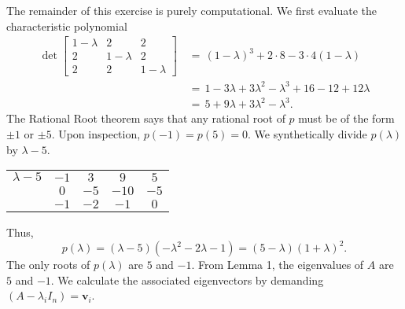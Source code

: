 \documentclass[10pt]{article}
\def\v{\bm{v}}
\def\det{\operatorname{det}}
\begin{document}
        The remainder of this exercise is purely computational. We first evaluate the characteristic polynomial
        \begin{align*}
                \det \begin{bmatrix}
                        1 - \lambda & 2 & 2 \\ 2 & 1 - \lambda & 2 \\ 2 & 2 & 1 - \lambda
                \end{bmatrix}
                        \,&=\, (1 - \lambda)^3  + 2\cdot 8 - 3\cdot 4(1 - \lambda) \\
                        \,&=\, 1 - 3\lambda + 3\lambda^2 - \lambda^3 + 16 - 12 + 12\lambda \\
                        \,&=\, 5 + 9\lambda + 3\lambda^2 - \lambda^3.
        \end{align*}
        The Rational Root theorem says that any rational root of $p$ must be of the form $\pm 1$ or $\pm 5$. Upon inspection,
        $p(-1) = p(5) = 0$. We synthetically divide $p(\lambda)$ by $\lambda - 5$.
        \begin{center}
        \begin{tabular}{c|cccc}
        $\lambda - 5$   & $-1$ & $3$  &   $9$ & $5$ \\
                        & $0$  & $-5$ & $-10$ & $-5$  \\\hline
                        & $-1$ & $-2$ &  $-1$ & $0$
        \end{tabular}
        \end{center}
        Thus,
        \[
                p(\lambda) = (\lambda - 5)(-\lambda^2 - 2\lambda - 1) = (5 - \lambda)(1 + \lambda)^2.
        \]
        The only roots of $p(\lambda)$ are $5$ and $-1$.
        From Lemma 1, the eigenvalues of $A$ are $5$ and $-1$.
        We calculate the associated eigenvectors by demanding $(A - \lambda_i I_n) = \v_i$. \\
                
\end{document}
